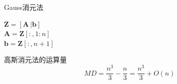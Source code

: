 \begin{algorithm}[h]
    \SetAlgoLined
    \caption{Gauss消元法}
    \label{alg:Gauss}
    $\boldsymbol{Z} = [\boldsymbol{A}\,| \boldsymbol{b}]$\\
    $\boldsymbol{A} = \boldsymbol{Z}[:,1:n]$\\
    $\boldsymbol{b} = \boldsymbol{Z}[:,n+1]$\\
\end{algorithm}
\begin{note}
    高斯消元法的运算量
    \[
        MD = \dfrac{n^3}{3}-\dfrac{n}{3} = \dfrac{n^3}{3} + O(n)
    \]
\end{note}
